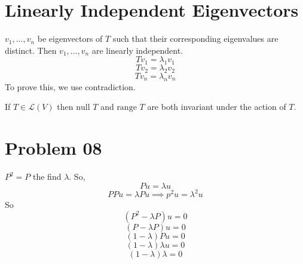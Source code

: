 \documentclass[letter]{article}
\begin{document}
\section*{Linearly Independent Eigenvectors} 
$ v_1, \ldots, v_n$ be eigenvectors of $T$ such that their corresponding eigenvalues are distinct. Then $v_1 ,\ldots, v_n$ are linearly independent. 
\[
T v_1 = \lambda_1 v_1
\]
\[
T v_2 = \lambda_2 v_2 
\] 
\[
T v_n = \lambda_n v_n
\] 
To prove this, we use contradiction. 

If $T \in \mathcal L(V) $ then $\text{null } T$ and $\text{range }T$ are both invariant under the action of $T$. 

\section*{Problem 08}
$P^2 = P$ the find $\lambda$. So, 
\[
Pu = \lambda u
\] 
\[
P P u = \lambda P u \implies p^2 u = \lambda^2 u
\] 
So \[
	(P^2 - \lambda P ) u = 0
\]
\[
	(P - \lambda P) u = 0
\] 
\[
	(1-\lambda) Pu = 0
\] 
\[
	(1- \lambda )\lambda u = 0
\] 
\[
	(1-\lambda)\lambda = 0
\] 
\end{document}
